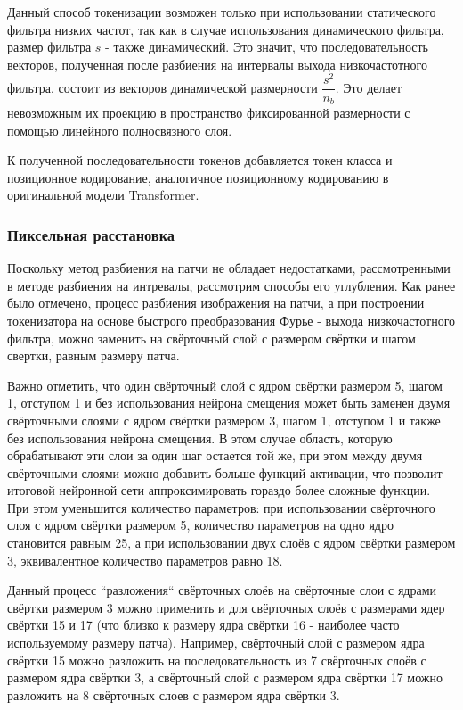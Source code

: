 \documentclass[times,specification,annotation]{itmo-student-thesis}
\begin{document}
Данный способ токенизации возможен только при использовании статического фильтра низких частот, так как в случае использования динамического фильтра, размер фильтра $s$ - также динамический. Это значит, что последовательность векторов, полученная после разбиения на интервалы выхода низкочастотного фильтра, состоит из векторов динамической размерности $\dfrac{s^2}{n_b}$. Это делает невозможным их проекцию в пространство фиксированной размерности с помощью линейного полносвязного слоя.

К полученной последовательности токенов добавляется токен класса и позиционное кодирование, аналогичное позиционному кодированию в оригинальной модели Transformer. 

\subsubsection{Пиксельная расстановка}
Поскольку метод разбиения на патчи не обладает недостатками, рассмотренными в методе разбиения на интревалы, рассмотрим способы его углубления. Как ранее было отмечено, процесс разбиения изображения на патчи, а при построении токенизатора на основе быстрого преобразования Фурье - выхода низкочастотного фильтра, можно заменить на свёрточный слой с размером свёртки и шагом свертки, равным размеру патча.

Важно отметить, что один свёрточный слой с ядром свёртки размером 5, шагом 1, отступом 1 и без использования нейрона смещения может быть заменен \cite{conv_replace} двумя свёрточными слоями с ядром свёртки размером 3, шагом 1, отступом 1 и также без использования нейрона смещения. В этом случае область, которую обрабатывают эти слои за один шаг остается той же, при этом между двумя свёрточными слоями можно добавить больше функций активации, что позволит итоговой нейронной сети аппроксимировать гораздо более сложные функции. При этом уменьшится количество параметров: при использовании свёрточного слоя с ядром свёртки размером 5, количество параметров на одно ядро становится равным 25, а при использовании двух слоёв с ядром свёртки размером 3, эквивалентное количество параметров равно 18. 

Данный процесс ``разложения`` свёрточных слоёв на свёрточные слои с ядрами свёртки размером 3 можно применить и для свёрточных слоёв с размерами ядер свёртки 15 и 17 (что близко к размеру ядра свёртки 16 - наиболее часто используемому размеру патча). Например, свёрточный слой с размером ядра свёртки 15 можно разложить на последовательность из 7 свёрточных слоёв с размером ядра свёртки 3, а свёрточный слой с размером ядра свёртки 17 можно разложить на 8 свёрточных слоев с размером ядра свёртки 3. 
\end{document}
